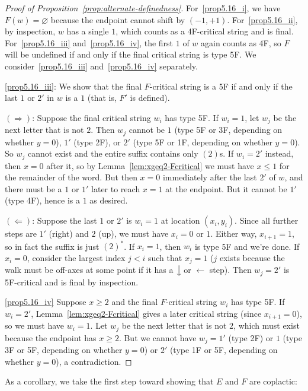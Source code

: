 \documentclass[10pt]{amsart}
\theoremstyle{definition}
\newcommand{\west}[1]{\ensuremath{\xleftarrow{\ #1\ }}}
\newcommand{\south}[1]{\ensuremath{\big \downarrow \!\text{\raisebox{.1ex}{\scriptsize $#1$}}}}
\begin{document}
\begin{proof}[Proof of Proposition~\ref{prop:alternate-definedness}]
For~\ref{prop5.16_i}, we have $F(w) = \varnothing$ because the endpoint cannot shift by $(-1,+1)$. For~\ref{prop5.16_ii}, by inspection, $w$ has a single $1$, which counts as a 4F-critical string and is final. For~\ref{prop5.16_iii} and~\ref{prop5.16_iv}, the first $1$ of $w$ again counts as 4F, so $F$ will be undefined if and only if the final critical string is type 5F. We consider~\ref{prop5.16_iii} and~\ref{prop5.16_iv} separately.

\ref{prop5.16_iii}: We show that the final $F$-critical string is a 5F if and only if the last $1$ or $2'$ in $w$ is a $1$ (that is, $F'$ is defined).

$(\Rightarrow)$: Suppose the final critical string $w_i$ has type 5F. If $w_i = 1$, let $w_j$ be the next letter that is not $2$. Then $w_j$ cannot be $1$ (type 5F or 3F, depending on whether $y=0$), $1'$ (type 2F), or $2'$ (type 5F or 1F, depending on whether $y=0$). So $w_j$ cannot exist and the entire suffix contains only $(2)$s. If $w_i = 2'$ instead, then $x=0$ after it, so by Lemma~\ref{lem:xgeq2-Fcritical} we must have $x \leq 1$ for the remainder of the word. But then $x=0$ immediately after the last $2'$ of $w$, and there must be a $1$ or $1'$ later to reach $x=1$ at the endpoint. But it cannot be $1'$ (type 4F), hence is a $1$ as desired. 

$(\Leftarrow)$: Suppose the last $1$ or $2'$ is $w_i = 1$ at location $(x_i,y_i)$. Since all further steps are $1'$ (right) and $2$ (up), we must have $x_i=0$ or $1$. Either way, $x_{i+1}=1$, so in fact the suffix is just $(2)^*$. If $x_i=1$, then $w_i$ is type 5F and we're done. If $x_i=0$, consider the largest index $j < i$ such that $x_j=1$ ($j$ exists because the walk must be off-axes at some point if it has a $\south{}$ or $\west{}$ step). Then $w_j = 2'$ is 5F-critical and is final by inspection.

\ref{prop5.16_iv} Suppose $x \geq 2$ and the final $F$-critical string $w_i$ has type 5F. If $w_i = 2'$, Lemma~\ref{lem:xgeq2-Fcritical} gives a later critical string (since $x_{i+1}=0$), so we must have $w_i = 1$. Let $w_j$ be the next letter that is not $2$, which must exist because the endpoint has $x \geq 2$. But we cannot have $w_j = 1'$ (type 2F) or $1$ (type 3F or 5F, depending on whether $y=0$) or $2'$ (type 1F or 5F, depending on whether $y=0$), a contradiction.
\end{proof}

As a corollary, we take the first step toward showing that $E$ and $F$ are coplactic:
\end{document}
